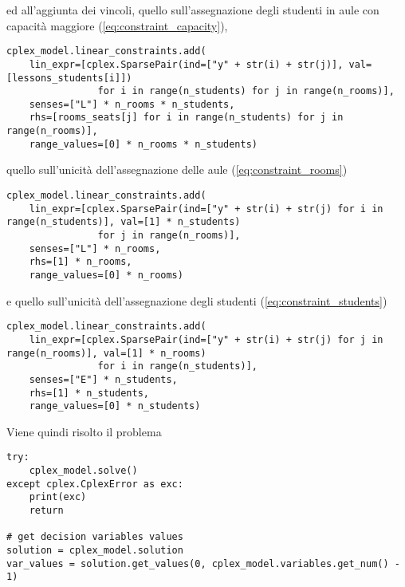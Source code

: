 \noindent
ed all'aggiunta dei vincoli, quello sull'assegnazione degli studenti 
in aule con capacità maggiore (\ref{eq:constraint_capacity}),

\begin{verbatim}
cplex_model.linear_constraints.add(
    lin_expr=[cplex.SparsePair(ind=["y" + str(i) + str(j)], val=[lessons_students[i]])
                for i in range(n_students) for j in range(n_rooms)],
    senses=["L"] * n_rooms * n_students,
    rhs=[rooms_seats[j] for i in range(n_students) for j in range(n_rooms)],
    range_values=[0] * n_rooms * n_students)
\end{verbatim} 

\noindent
quello sull'unicità dell'assegnazione delle aule (\ref{eq:constraint_rooms})

\begin{verbatim}
cplex_model.linear_constraints.add(
    lin_expr=[cplex.SparsePair(ind=["y" + str(i) + str(j) for i in range(n_students)], val=[1] * n_students)
                for j in range(n_rooms)],
    senses=["L"] * n_rooms,
    rhs=[1] * n_rooms,
    range_values=[0] * n_rooms)
\end{verbatim} 

\noindent
e quello sull'unicità dell'assegnazione degli studenti (\ref{eq:constraint_students})

\begin{verbatim}
cplex_model.linear_constraints.add(
    lin_expr=[cplex.SparsePair(ind=["y" + str(i) + str(j) for j in range(n_rooms)], val=[1] * n_rooms)
                for i in range(n_students)],
    senses=["E"] * n_students,
    rhs=[1] * n_students,
    range_values=[0] * n_students)
\end{verbatim} 

Viene quindi risolto il problema

\begin{verbatim}
try:
    cplex_model.solve()
except cplex.CplexError as exc:
    print(exc)
    return

# get decision variables values
solution = cplex_model.solution
var_values = solution.get_values(0, cplex_model.variables.get_num() - 1)
\end{verbatim} 

